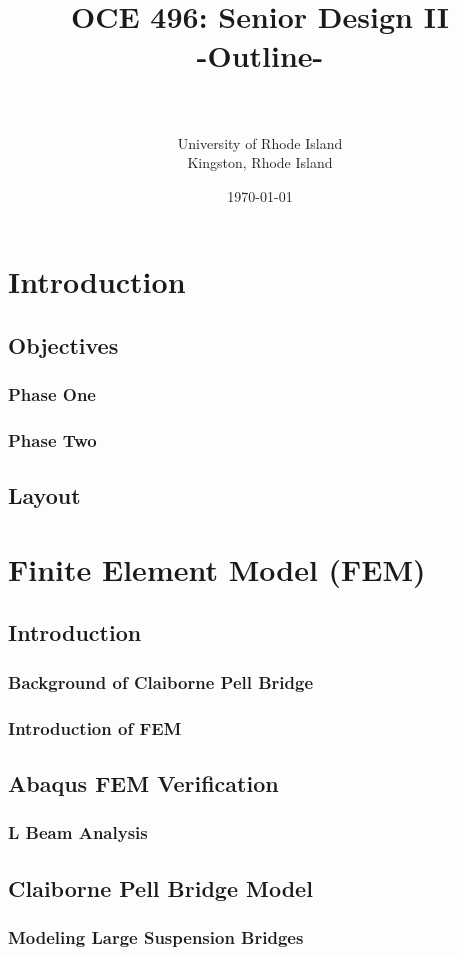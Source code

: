 \documentclass[twoside,11pt]{report}
\title{
	\fontsize{20pt}{10pt}\selectfont
	\textbf{OCE 496: Senior Design II\\ \fontsize{16}{10}\selectfont\textbf{-Outline-}}
	}
\author{%
	\large
	\textsc{}\\
	\normalsize{}\\
	\normalsize	University of Rhode Island\\
	\normalsize Kingston, Rhode Island\\
	}
\date{\normalsize\vspace{-3mm}\today}
\begin{document}
\maketitle
\tableofcontents

\chapter{Introduction}
	\section{Objectives}
		\subsection{Phase One}
		\subsection{Phase Two}
	\section{Layout}
\chapter{Finite Element Model (FEM)}
	\section{Introduction}
		\subsection{Background of Claiborne Pell Bridge}
		\subsection{Introduction of FEM}
	\section{Abaqus FEM Verification}
		\subsection{L Beam Analysis}
	\section{Claiborne Pell Bridge Model}
		\subsection{Modeling Large Suspension Bridges}
\end{document}
